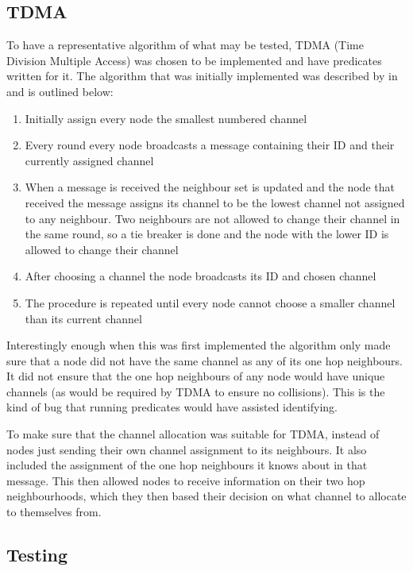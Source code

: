 \subsection{TDMA}

To have a representative algorithm of what may be tested, TDMA (Time Division Multiple Access) was chosen to be implemented and have predicates written for it. The algorithm that was initially implemented was described by \citeauthor{DCATechReport} in \cite[p.~4]{DCATechReport} and is outlined below:

\begin{enumerate}
\item Initially assign every node the smallest numbered channel
\item Every round every node broadcasts a message containing their ID and their currently assigned channel
\item When a message is received the neighbour set is updated and the node that received the message assigns its channel to be the lowest channel not assigned to any neighbour. Two neighbours are not allowed to change their channel in the same round, so a tie breaker is done and the node with the lower ID is allowed to change their channel
\item After choosing a channel the node broadcasts its ID and chosen channel
\item The procedure is repeated until every node cannot choose a smaller channel than its current channel
\end{enumerate}

Interestingly enough when this was first implemented the algorithm only made sure that a node did not have the same channel as any of its one hop neighbours. It did not ensure that the one hop neighbours of any node would have unique channels (as would be required by TDMA to ensure no collisions). This is the kind of bug that running predicates would have assisted identifying.

To make sure that the channel allocation was suitable for TDMA, instead of nodes just sending their own channel assignment to its neighbours. It also included the assignment of the one hop neighbours it knows about in that message. This then allowed nodes to receive information on their two hop neighbourhoods, which they then based their decision on what channel to allocate to themselves from.

\subsection{Testing}


